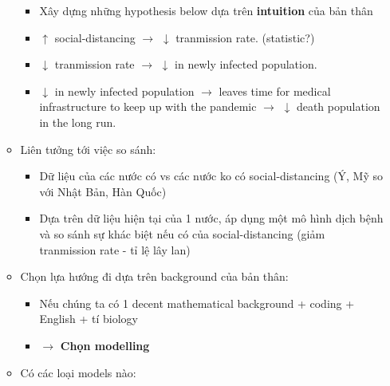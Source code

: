 \documentclass[11pt]{article}
\providecommand{\tightlist}{%
      \setlength{\itemsep}{0pt}\setlength{\parskip}{0pt}}
\begin{document}
\begin{itemize}
\begin{itemize}
    \begin{itemize}
    \tightlist
    \item
      Xây dựng những hypothesis below dựa trên \textbf{intuition} của
      bản thân
    \item
      \(\uparrow\) social-distancing \(\rightarrow\) \(\downarrow\)
      tranmission rate. (statistic?)
    \item
      \(\downarrow\) tranmission rate \(\rightarrow\) \(\downarrow\) in
      newly infected population.
    \item
      \(\downarrow\) in newly infected population \(\rightarrow\) leaves
      time for medical infrastructure to keep up with the pandemic
      \(\rightarrow\) \(\downarrow\) death population in the long run.
    \end{itemize}
  \item
    Liên tưởng tới việc so sánh:

    \begin{itemize}
    \tightlist
    \item
      Dữ liệu của các nước có vs các nước ko có social-distancing (Ý, Mỹ
      so với Nhật Bản, Hàn Quốc)
    \item
      Dựa trên dữ liệu hiện tại của 1 nước, áp dụng một mô hình dịch
      bệnh và so sánh sự khác biệt nếu có của social-distancing (giảm
      tranmission rate - tỉ lệ lây lan)
    \end{itemize}
  \item
    Chọn lựa hướng đi dựa trên background của bản thân:

    \begin{itemize}
    \tightlist
    \item
      Nếu chúng ta có 1 decent mathematical background + coding +
      English + tí biology
    \item
      \(\rightarrow\) \textbf{Chọn modelling}
    \end{itemize}
  \item
    Có các loại models nào:


\end{itemize}
\end{itemize}
\end{document}
